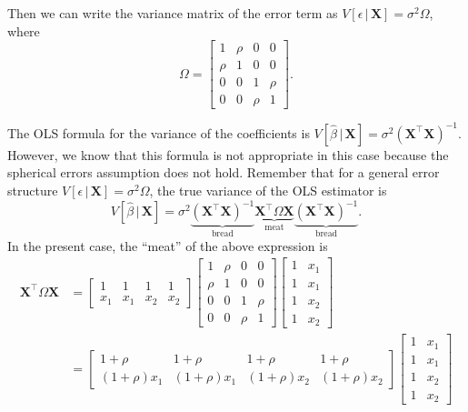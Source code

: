 \documentclass[12pt,oneside,openany]{book}
\begin{document}
Then we can write the variance matrix of the error term as
\(V[\epsilon \,|\, \mathbf{X}] = \sigma^2 \Omega\), where \[
\Omega = \begin{bmatrix}
1 & \rho & 0 & 0 \\
\rho & 1 & 0 & 0 \\
0 & 0 & 1 & \rho \\
0 & 0 & \rho & 1
\end{bmatrix}.
\]

The OLS formula for the variance of the coefficients is
\(V[\hat{\beta} \,|\, \mathbf{X}] = \sigma^2 (\mathbf{X}^\top \mathbf{X})^{-1}\).
However, we know that this formula is not appropriate in this case
because the spherical errors assumption does not hold. Remember that for
a general error structure
\(V[\epsilon \,|\, \mathbf{X}] = \sigma^2 \Omega\), the true variance of
the OLS estimator is \[
V[\hat{\beta} \,|\, \mathbf{X}]
= \sigma^2 \underbrace{(\mathbf{X}^\top \mathbf{X})^{-1}}_{\text{bread}} \underbrace{\mathbf{X}^\top \Omega \mathbf{X}}_{\text{meat}} \underbrace{(\mathbf{X}^\top \mathbf{X})^{-1}}_{\text{bread}}.
\] In the present case, the ``meat'' of the above expression is \[
\begin{aligned}
\mathbf{X}^\top \Omega \mathbf{X}
&= \begin{bmatrix}
1 & 1 & 1 & 1 \\
x_1 & x_1 & x_2 & x_2
\end{bmatrix}
\begin{bmatrix}
1 & \rho & 0 & 0 \\
\rho & 1 & 0 & 0 \\
0 & 0 & 1 & \rho \\
0 & 0 & \rho & 1
\end{bmatrix}
\begin{bmatrix}
1 & x_1 \\
1 & x_1 \\
1 & x_2 \\
1 & x_2
\end{bmatrix} \\
&= \begin{bmatrix}
1 + \rho & 1 + \rho & 1 + \rho & 1 + \rho \\
(1 + \rho) x_1 & (1 + \rho) x_1 & (1 + \rho) x_2 & (1 + \rho) x_2
\end{bmatrix}
\begin{bmatrix}
1 & x_1 \\
1 & x_1 \\
1 & x_2 \\
1 & x_2
\end{bmatrix} \\

\end{aligned}\]
\end{document}
